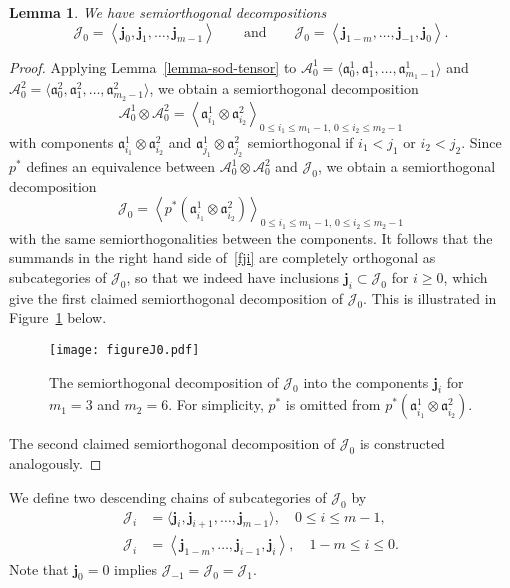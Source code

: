 \documentclass[11pt, reqno]{amsart}
\numberwithin{equation}{section}
\theoremstyle{plain}
\newtheorem{lemma}[theorem]{Lemma}
\theoremstyle{definition}
\newcommand{\llangle}{\left \langle}
\newcommand{\rrangle}{\right \rangle}
\newcommand{\cA}{\mathcal{A}}
\newcommand{\cJ}{\mathcal{J}}
\newcommand{\fa}{\mathfrak{a}}
\newcommand{\fj}{\mathbf{j}}
\newcommand{\bj}{\mathbf{j}}
\begin{document}
\begin{lemma}
\label{lemma:cj0-sod}
We have semiorthogonal decompositions
\begin{equation*}
\cJ_0  = \llangle \fj_0, \fj_1, \dots, \fj_{m-1} \rrangle
\qquad\text{and}\qquad
\cJ_0 = \llangle \fj_{1-m}, \dots, \fj_{-1}, \fj_{0} \rrangle. 
\end{equation*}
\end{lemma}
\begin{proof}
Applying Lemma~\ref{lemma-sod-tensor} to $\cA^1_0 = \langle \fa^1_{0},\fa^1_1,\dots,\fa^1_{m_1-1} \rangle$ and 
$\cA^2_0 = \langle \fa^2_{0},\fa^2_1,\dots,\fa^2_{m_2-1} \rangle$, 
we obtain a semiorthogonal decomposition
\begin{equation*}
\cA^1_0 \otimes \cA^2_0 = \llangle \fa^1_{i_1} \otimes \fa^2_{i_2} \rrangle_{0 \le i_1 \le m_1-1,\, 0 \le i_2 \le m_2-1}
\end{equation*}
with components $\fa^1_{i_1} \otimes \fa^2_{i_2}$ and $\fa^1_{j_1} \otimes \fa^2_{j_2}$ semiorthogonal if $i_1 < j_1$ or $i_2 < j_2$.
Since $p^*$ defines an equivalence between $\cA^1_0 \otimes \cA^2_0$ and $\cJ_0$, 
we obtain a semiorthogonal decomposition
\begin{equation*}
\cJ_0 = \llangle p^*(\fa^1_{i_1} \otimes \fa^2_{i_2}) \rrangle_{0 \le i_1 \le m_1-1, \, 0 \le i_2 \le m_2-1}
\end{equation*}
with the same semiorthogonalities between the components.
It follows that the summands in the right hand side of~\eqref{fji} are completely orthogonal 
as subcategories of $\cJ_0$, so that we indeed have inclusions $\fj_i \subset \cJ_0$ for $i \geq 0$, 
which give the first claimed semiorthogonal decomposition of $\cJ_0$. 
This is illustrated in Figure~\ref{figure:J0} below. 
\begin{figure}[h]
\centering
\texttt{[image: figureJ0.pdf]}
\caption{The semiorthogonal decomposition of $\cJ_0$ into the components $\bj_i$ for $m_1 = 3$ and $m_2 = 6$. 
For simplicity, $p^*$ is omitted from $p^*(\fa^1_{i_1} \otimes \fa^2_{i_2})$. }  
\label{figure:J0}
\end{figure}

The second claimed semiorthogonal decomposition of $\cJ_0$ is constructed analogously.
\end{proof}



We define two descending chains of subcategories of $\cJ_0$ by 
\begin{align}
\label{Ji}
\cJ_i  & = \langle \fj_i, \fj_{i+1}, \dots, \fj_{m-1} \rangle , \quad 0 \leq i \leq m-1, \\ 
\label{Ji-left}
\cJ_i & = \llangle \fj_{1-m}, \dots, \fj_{i-1}, \fj_{i} \rrangle, \quad 1- m \leq i \leq 0.
\end{align}
Note that $\fj_0 = 0$ implies $\cJ_{-1} = \cJ_0 = \cJ_1$.
\end{document}

